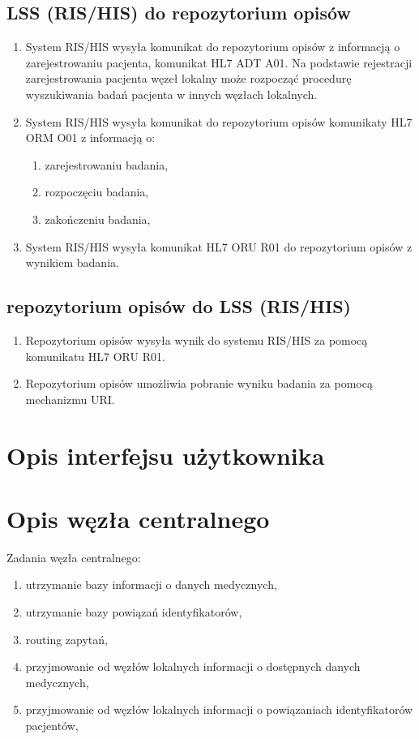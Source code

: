 \documentclass[a4paper]{report}
\begin{document}
\subsection{LSS (RIS/HIS) do repozytorium opisów}

\begin{enumerate}
  \item System RIS/HIS wysyła komunikat do repozytorium opisów z informacją o zarejestrowaniu pacjenta, komunikat HL7 ADT A01. Na podstawie rejestracji zarejestrowania pacjenta węzeł lokalny może rozpocząć procedurę wyszukiwania badań pacjenta w innych węzłach lokalnych.
  \item System RIS/HIS wysyła komunikat do repozytorium opisów komunikaty HL7 ORM O01 z informacją o:
    \begin{enumerate}
      \item zarejestrowaniu badania,
      \item rozpoczęciu badania,
      \item zakończeniu badania,
    \end{enumerate}
  \item System RIS/HIS wysyła komunikat HL7 ORU R01 do repozytorium opisów z wynikiem badania.
\end{enumerate}

\subsection{repozytorium opisów do LSS (RIS/HIS)}

\begin{enumerate}
  \item Repozytorium opisów wysyła wynik do systemu RIS/HIS za pomocą komunikatu HL7 ORU R01.
  \item Repozytorium opisów umożliwia pobranie wyniku badania za pomocą mechanizmu URI.
\end{enumerate}


\section{Opis interfejsu użytkownika}

\section{Opis węzła centralnego}
Zadania węzła centralnego:
\begin{enumerate}
\item utrzymanie bazy informacji o danych medycznych,
\item utrzymanie bazy powiązań identyfikatorów,
\item routing zapytań,
\item przyjmowanie od węzłów lokalnych informacji o dostępnych danych medycznych,
\item przyjmowanie od węzłów lokalnych informacji o powiązaniach identyfikatorów pacjentów,
\end{enumerate}
\end{document}
